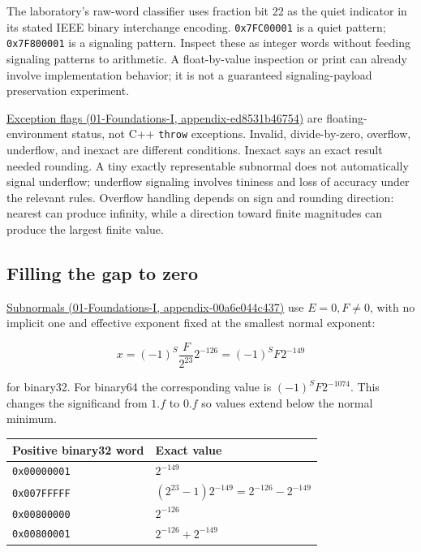 The laboratory's raw-word classifier uses fraction bit 22 as the quiet indicator in its stated IEEE binary interchange encoding. \texttt{0x7FC00001} is a quiet pattern; \texttt{0x7F800001} is a signaling pattern. Inspect these as integer words without feeding signaling patterns to arithmetic. A float-by-value inspection or print can already involve implementation behavior; it is not a guaranteed signaling-payload preservation experiment.

\href{../01-Foundations-I/main.pdf\#nameddest=appendix-ed8531b46754}{Exception flags (01-Foundations-I, appendix-ed8531b46754)} are floating-environment status, not C++ \texttt{throw} exceptions. Invalid, divide-by-zero, overflow, underflow, and inexact are different conditions. Inexact says an exact result needed rounding. A tiny exactly representable subnormal does not automatically signal underflow; underflow signaling involves tininess and loss of accuracy under the relevant rules. Overflow handling depends on sign and rounding direction: nearest can produce infinity, while a direction toward finite magnitudes can produce the largest finite value.

\subsection{Filling the gap to zero}\label{05-engine-i-ch001-filling-the-gap-to-zero}

\href{../01-Foundations-I/main.pdf\#nameddest=appendix-00a6e044c437}{Subnormals (01-Foundations-I, appendix-00a6e044c437)} use \(E=0,F\ne0\), with no implicit one and effective exponent fixed at the smallest normal exponent:

\[
x=(-1)^S\frac{F}{2^{23}}2^{-126}=(-1)^S F2^{-149}
\]

for binary32. For binary64 the corresponding value is \((-1)^S F2^{-1074}\). This changes the significand from \(1.f\) to \(0.f\) so values extend below the normal minimum.

{\def\LTcaptype{none} %
\begin{longtable}[]{@{}ll@{}}
\toprule\noalign{}
Positive binary32 word & Exact value \\
\midrule\noalign{}
\endhead
\bottomrule\noalign{}
\endlastfoot
\texttt{0x00000001} & \(2^{-149}\) \\
\texttt{0x007FFFFF} & \((2^{23}-1)2^{-149}=2^{-126}-2^{-149}\) \\
\texttt{0x00800000} & \(2^{-126}\) \\
\texttt{0x00800001} & \(2^{-126}+2^{-149}\) \\
\end{longtable}
}


